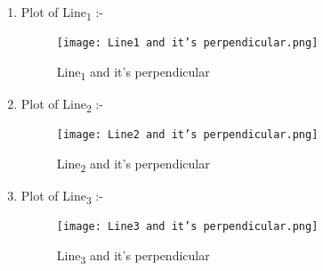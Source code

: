 \documentclass[journal,12pt,twocolumn]{IEEEtran}
\begin{document}
\begin{enumerate}[label=(\Alph*)]
\item Plot of Line\textsubscript{1} :-
\begin{figure}[H]
\centering
\texttt{[image: Line1 and it's perpendicular.png]}
\caption{Line\textsubscript{1} and it's perpendicular}
\label{fig:circle}	
\end{figure}
\item Plot of Line\textsubscript{2} :-
\begin{figure}[H]
\centering
\texttt{[image: Line2 and it's perpendicular.png]}
\caption{Line\textsubscript{2} and it's perpendicular}
\label{fig:circle}	
\end{figure}
 \item Plot of Line\textsubscript{3} :-
\begin{figure}[H]
\centering
\texttt{[image: Line3 and it's perpendicular.png]}
\caption{Line\textsubscript{3} and it's perpendicular}
\label{fig:circle}	
\end{figure}

\end{enumerate}
\end{document}
